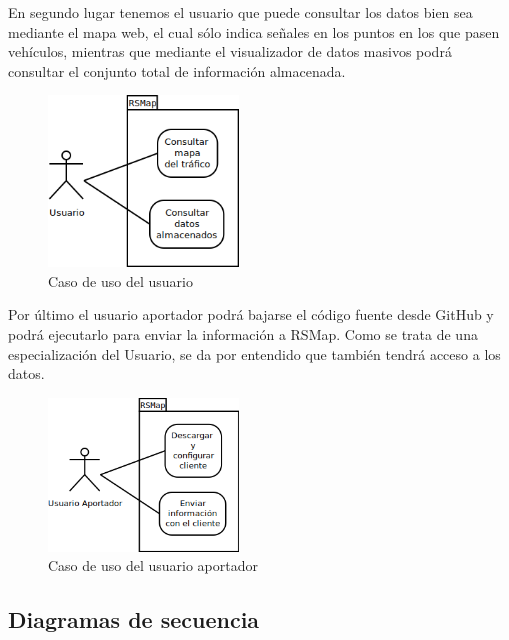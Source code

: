 \newpage

En segundo lugar tenemos el usuario que puede consultar los datos bien sea mediante el mapa web, el cual sólo indica señales en los puntos en los que pasen vehículos, mientras que mediante el visualizador de datos masivos podrá consultar el conjunto total de información almacenada.

\begin{figure}[!ht]
  \begin{center}
  \includegraphics[width=0.45\textwidth]{../images/diag_plan/cu_usuario.png}
  \caption{Caso de uso del usuario}
  \label{fig:cu_usuario}
  \end{center}
\end{figure}

Por último el usuario aportador podrá bajarse el código fuente desde GitHub y podrá ejecutarlo para enviar la información a RSMap. Como se trata de una especialización del Usuario, se da por entendido que también tendrá acceso a los datos.

\begin{figure}[!ht]
  \begin{center}
  \includegraphics[width=0.45\textwidth]{../images/diag_plan/cu_usuario_aportador.png}
  \caption{Caso de uso del usuario aportador}
  \label{fig:cu_uaportador}
  \end{center}
\end{figure}

\newpage


\subsection{Diagramas de secuencia}

